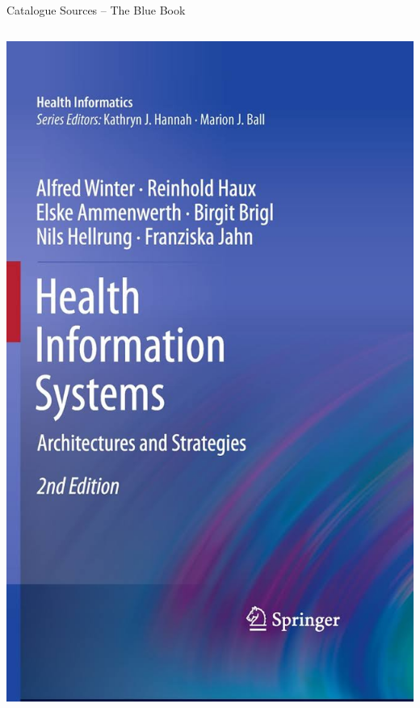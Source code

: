 \documentclass[aspectratio=1610,12pt]{beamer}
\newcommand{\enquote}[1]{{\glqq#1\grqq{}}}
\begin{document}
\begin{frame}{Catalogue Sources -- The \enquote{Blue Book}}
\begin{columns}
  \vspace{0.5cm}
  \centering
  \includegraphics[height=.8\textheight]{img/bb-cover.jpg}
  \vspace{0.5cm}
  \hspace{-0.5cm}

\end{columns}
\end{frame}
\end{document}
